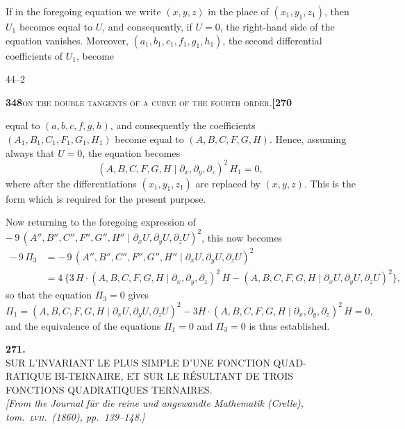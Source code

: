 \documentclass[11pt]{article}
\newcommand{\Cdel}{\mid}
\begin{document}
\medskip

\noindent If in the foregoing equation we write $(x, y, z)$ in the place of $(x_1, y_1, z_1)$, then $U_1$ becomes equal to $U$, and consequently, if $U = 0$, the right-hand side of the equation vanishes. Moreover, $(a_1, b_1, c_1, f_1, g_1, h_1)$, the second differential coefficients of $U_1$, become

\hfill 44--2

\newpage
\setcounter{page}{348}

\noindent\textbf{348}\hfill\textsc{on the double tangents of a curve of the fourth order.}\hfill\textbf{[270}

\medskip

\noindent equal to $(a, b, c, f, g, h)$, and consequently the coefficients $(A_1, B_1, C_1, F_1, G_1, H_1)$ become equal to $(A, B, C, F, G, H)$. Hence, assuming always that $U = 0$, the equation becomes
\[
   (A, B, C, F, G, H\Cdel\partial_x, \partial_y, \partial_z)^2\,H_1 = 0,
\]
where after the differentiations $(x_1, y_1, z_1)$ are replaced by $(x, y, z)$. This is the form which is required for the present purpose.

\medskip

\noindent Now returning to the foregoing expression of $-\,9\,(A'', B'', C'', F'', G'', H''\Cdel\partial_x U,\partial_y U,\partial_z U)^2$, this now becomes
\[
\begin{aligned}
   -\,9\,\Pi_3 &= -\,9\,(A'', B'', C'', F'', G'', H''\Cdel\partial_x U,\partial_y U,\partial_z U)^2\\
                &= 4\,\{3\,H\cdot(A, B, C, F, G, H\Cdel\partial_x,\partial_y,\partial_z)^2\,H - (A, B, C, F, G, H\Cdel\partial_x U,\partial_y U,\partial_z U)^2\},
\end{aligned}
\]
so that the equation $\Pi_3 = 0$ gives
\[
   \Pi_1 = (A, B, C, F, G, H\Cdel\partial_x U,\partial_y U,\partial_z U)^2 - 3 H\cdot(A, B, C, F, G, H\Cdel\partial_x,\partial_y,\partial_z)^2\,H = 0,
\]
and the equivalence of the equations $\Pi_1 = 0$ and $\Pi_3 = 0$ is thus established.

\newpage
\setcounter{page}{349}



\begin{center}
\textbf{271.}\\[1em]
{\Large SUR L'INVARIANT LE PLUS SIMPLE D'UNE FONCTION QUAD-}\\[0.3em]
{\Large RATIQUE BI-TERNAIRE, ET SUR LE R\'ESULTANT DE TROIS}\\[0.3em]
{\Large FONCTIONS QUADRATIQUES TERNAIRES.}\\[1em]
\textit{[From the Journal f\"ur die reine und angewandte Mathematik (Crelle), tom.~\textsc{lvii}.\ (1860), pp.~139--148.]}
\end{center}
\end{document}
